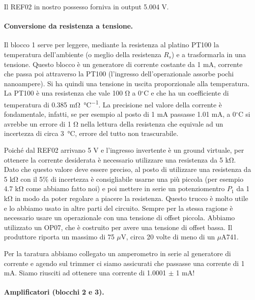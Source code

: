 Il REF02 in nostro possesso forniva in output 5.004 V. 

\paragraph{Conversione da resistenza a tensione.}

Il blocco 1 serve per leggere, mediante la resistenza al platino PT100 la temperatura dell'ambiente (o meglio della
resistenza $R_s$) e a trasformarla in una tensione. Questo blocco è un generatore di corrente costante da 1 mA, corrente
che passa poi attraverso la PT100 (l'ingresso dell'operazionale assorbe pochi nanoampere). Si ha quindi una tensione in uscita
proporzionale alla temperatura.
La PT100 è una resistenza che vale 100 \si{\ohm} a 0$^\circ$C e che ha un coefficiente di temperatura di 0.385 \si{\milli\ohm\per\celsius}.
La precisione nel valore della corrente è fondamentale, infatti, se per esempio al posto di 1 mA passasse 1.01 mA,
a 0$^\circ$C si avrebbe un errore di 1 \si{\ohm} nella lettura della resistenza che equivale ad un incertezza di circa \SI{3}{\celsius},
errore del tutto non trascurabile.

Poiché dal REF02 arrivano 5 V e l'ingresso invertente è un ground virtuale, per ottenere la corrente desiderata
è necessario utilizzare una resistenza da 5 \si{\kilo\ohm}. Dato che questo valore deve essere preciso, al posto
di utilizzare una resistenza da 5 \si{\kilo\ohm} con il 5\% di incertezza è consigliabile usarne una più piccola
(per esempio 4.7 \si{\kilo\ohm} come abbiamo fatto noi) e poi mettere in serie un potenziomentro $P_1$ da 1 \si{\kilo\ohm}
in modo da poter regolare a piacere la resistenza. Questo trucco è molto utile e lo abbiamo usato in altre parti del circuito.
Sempre per la stessa ragione è necessario usare un operazionale con una tensione di offset piccola.
Abbiamo utilizzato un OP07, che è costruito per avere una tensione
di offset bassa. Il produttore riporta un massimo di 75 $\mu$V, circa 20 volte di meno di un $\mu$A741. 

Per la taratura abbiamo collegato un amperometro in serie al generatore di corrente e agendo sul trimmer
ci siamo assicurati che passasse una corrente di 1 mA. Siamo riusciti ad ottenere una corrente di 1.0001 $\pm$ 1 mA!

\paragraph{Amplificatori (blocchi 2 e 3).}

